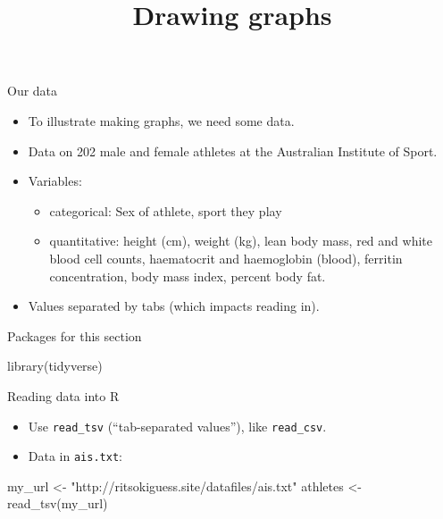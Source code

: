 \documentclass[
  ignorenonframetext,
]{beamer}
\title{Drawing graphs}
\author{}
\date{}
\newenvironment{Shaded}{\begin{snugshade}}{\end{snugshade}}
\newcommand{\FunctionTok}[1]{\textcolor[rgb]{0.28,0.35,0.67}{#1}}
\newcommand{\NormalTok}[1]{\textcolor[rgb]{0.00,0.23,0.31}{#1}}
\newcommand{\OtherTok}[1]{\textcolor[rgb]{0.00,0.23,0.31}{#1}}
\newcommand{\StringTok}[1]{\textcolor[rgb]{0.13,0.47,0.30}{#1}}
\providecommand{\tightlist}{%
  \setlength{\itemsep}{0pt}\setlength{\parskip}{0pt}}\usepackage{longtable,booktabs,array}
\begin{document}
\frame{\titlepage}


\begin{frame}{Our data}
\label{our-data}
\begin{itemize}
\tightlist
\item
  To illustrate making graphs, we need some data.
\item
  Data on 202 male and female athletes at the Australian Institute of
  Sport.
\item
  Variables:

  \begin{itemize}
  \tightlist
  \item
    categorical: Sex of athlete, sport they play
  \item
    quantitative: height (cm), weight (kg), lean body mass, red and
    white blood cell counts, haematocrit and haemoglobin (blood),
    ferritin concentration, body mass index, percent body fat.
  \end{itemize}
\item
  Values separated by tabs (which impacts reading in).
\end{itemize}
\end{frame}

\begin{frame}[fragile]{Packages for this section}
\label{packages-for-this-section}
\begin{Shaded}
\begin{Highlighting}[]
\FunctionTok{library}\NormalTok{(tidyverse)}
\end{Highlighting}
\end{Shaded}
\end{frame}

\begin{frame}[fragile]{Reading data into R}
\label{reading-data-into-r}
\begin{itemize}
\tightlist
\item
  Use \texttt{read\_tsv} (``tab-separated values''), like
  \texttt{read\_csv}.
\item
  Data in \texttt{ais.txt}:
\end{itemize}

\begin{Shaded}
\begin{Highlighting}[]
\NormalTok{my\_url }\OtherTok{\textless{}{-}} \StringTok{"http://ritsokiguess.site/datafiles/ais.txt"}
\NormalTok{athletes }\OtherTok{\textless{}{-}} \FunctionTok{read\_tsv}\NormalTok{(my\_url)}
\end{Highlighting}
\end{Shaded}
\end{frame}
\end{document}
